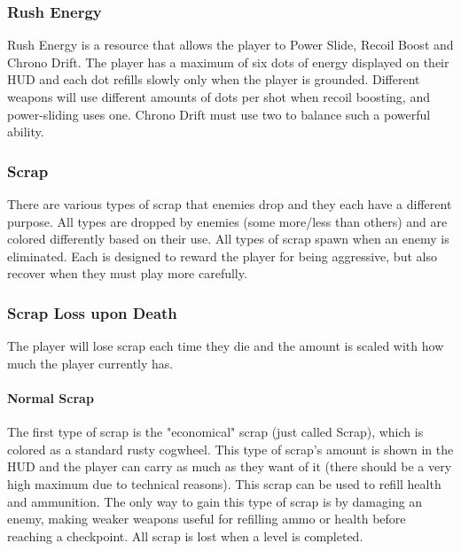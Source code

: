 \documentclass[12pt]{article}
\begin{document}
\subsubsection{Rush Energy}

Rush Energy is a resource that allows the player to Power Slide, Recoil Boost and Chrono Drift. The player has a maximum of six dots of energy displayed on their HUD and each dot refills slowly only when the player is grounded. Different weapons will use different amounts of dots per shot when recoil boosting, and power-sliding uses one. Chrono Drift must use two to balance such a powerful ability. 

\subsubsection{Scrap}

There are various types of scrap that enemies drop and they each have a different purpose. All types are dropped by enemies (some more/less than others) and are colored differently based on their use. All types of scrap spawn when an enemy is eliminated. Each is designed to reward the player for being aggressive, but also recover when they must play more carefully. 

\subsubsection{Scrap Loss upon Death}

The player will lose scrap each time they die and the amount is scaled with how much the player currently has. 

\paragraph{Normal Scrap}

The first type of scrap is the "economical" scrap (just called Scrap), which is colored as a standard rusty cogwheel. This type of scrap's amount is shown in the HUD and the player can carry as much as they want of it (there should be a very high maximum due to technical reasons). This scrap can be used to refill health  and ammunition. %
The only way to gain this type of scrap is by damaging an enemy, making weaker weapons useful for refilling ammo or health before reaching a checkpoint. All scrap is lost when a level is completed.
\end{document}
